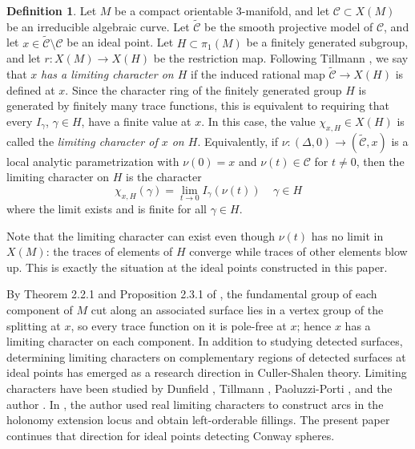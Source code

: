\documentclass{article}
\theoremstyle{plain}
\theoremstyle{definition}
\newtheorem{definition}[theorem]{Definition}
\theoremstyle{plain}
\theoremstyle{plain}
\theoremstyle{plain}
\theoremstyle{remark}
\theoremstyle{remark}
\theoremstyle{plain}
\theoremstyle{plain}
\theoremstyle{plain}
\theoremstyle{plain}
\begin{document}
\begin{definition}
Let $M$ be a compact orientable 3-manifold, and let $\mathcal{C} \subset X(M)$ be an irreducible algebraic curve. Let $\widetilde{\mathcal{C}}$ be the smooth projective model of $\mathcal{C}$, and let $x \in \widetilde{\mathcal{C}} \setminus \mathcal{C}$ be an ideal point. Let $H \subset \pi_1(M)$ be a finitely generated subgroup, and let $r: X(M) \to X(H)$ be the restriction map. Following Tillmann \cite{tillmann}, we say that $x$ \emph{has a limiting character on $H$} if the induced rational map $\widetilde{\mathcal{C}} \to X(H)$ is defined at $x$. Since the character ring of the finitely generated group $H$ is generated by finitely many trace functions, this is equivalent to requiring that every $I_\gamma$, $\gamma \in H$, have a finite value at $x$. In this case, the value $\chi_{x, H} \in X(H)$ is called the \emph{limiting character of $x$ on $H$}. Equivalently, if $\nu: (\Delta, 0) \to (\widetilde{\mathcal{C}}, x)$ is a local analytic parametrization with $\nu(0) = x$ and $\nu(t) \in \mathcal{C}$ for $t \neq 0$, then the limiting character on $H$ is the character
\begin{equation*}
	\chi_{x, H}(\gamma) = \lim_{t \to 0}I_\gamma(\nu(t)) \ \ \ \ \ \gamma \in H
\end{equation*}
where the limit exists and is finite for all $\gamma \in H$.
\end{definition}

Note that the limiting character can exist even though $\nu(t)$ has no limit in $X(M)$: the traces of elements of $H$ converge while traces of other elements blow up. This is exactly the situation at the ideal points constructed in this paper.

\medskip

By Theorem 2.2.1 and Proposition 2.3.1 of \cite{cullershalen}, the fundamental group of each component of $M$ cut along an associated surface lies in a vertex group of the splitting at $x$, so every trace function on it is pole-free at $x$; hence $x$ has a limiting character on each component. In addition to studying detected surfaces, determining limiting characters on complementary regions of detected surfaces at ideal points has emerged as a research direction in Culler-Shalen theory. Limiting characters have been studied by Dunfield \cite{dunfield}, Tillmann \cite{tillmann}, Paoluzzi-Porti \cite{paoluzziporti}, and the author \cite{WangLimitingCharacters, WangPuncturedJSJTori}. In \cite{WangDetectedSeifertSurfaces}, the author used real limiting characters to construct arcs in the holonomy extension locus and obtain left-orderable fillings. The present paper continues that direction for ideal points detecting Conway spheres.
\end{document}
